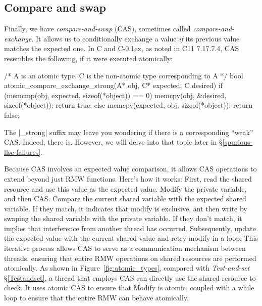 \documentclass[fontsize=10pt, oneside]{scrartcl}
\newcommand{\cplusplus}[1]{C\kern-0.1ex\raisebox{0.15ex}{\texttt{++}}}
\newcommand{\clang}[1]{C}
\newcommand{\fig}[1]{Figure~\ref{#1}}
\newcommand{\introduce}[1]{\textit{#1}}
\newcommand{\secref}[1]{\hyperref[#1]{\textsc{\S}\ref*{#1}}}
\begin{document}
\subsection{Compare and swap}
\label{cas}
Finally, we have \introduce{compare-and-swap} (\textsc{CAS}),
sometimes called \introduce{compare-and-exchange}.
It allows us to conditionally exchange a value \emph{if} its previous value matches the expected one.
In \clang{} and \cplusplus{}, as noted in C11 7.17.7.4, \textsc{CAS} resembles the following,
if it were executed atomically:
\begin{ccode}
/* A is an atomic type. C is the non-atomic type corresponding to A */
bool atomic_compare_exchange_strong(A* obj, C* expected, C desired)
{
    if (memcmp(obj, expected, sizeof(*object)) == 0) {
        memcpy(obj, &desired, sizeof(*object));
        return true;
    } else {
        memcpy(expected, obj, sizeof(*object));
        return false;
    }
}
\end{ccode}

\begin{samepage}
\noindent The \cpp|_strong| suffix may leave you wondering if there is a corresponding ``weak'' \textsc{CAS}.
Indeed, there is. However, we will delve into that topic later in \secref{spurious-llsc-failures}.
\end{samepage}

Because \textsc{CAS} involves an expected value comparison, 
it allows \textsc{CAS} operations to extend beyond just \textsc{RMW} functions. 
Here's how it works: First, read the shared resource and use this value as the expected value. 
Modify the private variable, and then \textsc{CAS}. Compare the current shared variable with the expected shared variable. 
If they match, it indicates that modify is exclusive, ant then write by swaping the shared variable with the private variable.
If they don't match, it implies that interference from another thread has occurred.
Subsequently, update the expected value with the current shared value and retry modify in a loop. 
This iterative process allows \textsc{CAS} to serve as a communication mechanism between threads, 
ensuring that entire \textsc{RMW} operations on shared resources are performed atomically.
As shown in \fig{fig:atomic_types}, compared with \introduce{Test-and-set} \secref{Testandset}, 
a thread that employs \textsc{CAS} can directly use the shared resource to check.
It uses atomic \textsc{CAS} to ensure that Modify is atomic, 
coupled with a while loop to ensure that the entire \textsc{RMW} can behave atomically.
\end{document}
